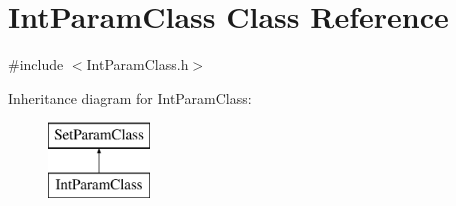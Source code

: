 \hypertarget{class_int_param_class}{}\section{Int\+Param\+Class Class Reference}
\label{class_int_param_class}


{\ttfamily \#include $<$Int\+Param\+Class.\+h$>$}

Inheritance diagram for Int\+Param\+Class\+:\begin{figure}[H]
\begin{center}
\leavevmode
\includegraphics[height=2.000000cm]{class_int_param_class}
\end{center}
\end{figure}
